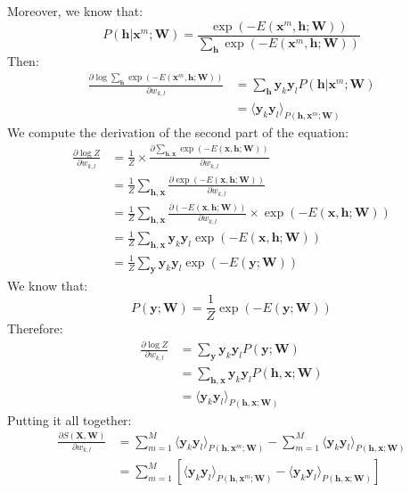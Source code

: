\documentclass[11pt, oneside]{article}   	%
\begin{document}
	Moreover, we know that:
	\[P(\mathbf h | \mathbf x^m;\mathbf W) = \frac{\exp(-E(\mathbf x^m,\mathbf h;\mathbf W))}{\sum_\mathbf h\exp(-E(\mathbf x^m,\mathbf h;\mathbf W))}\]
	Then:
	\[\begin{split}
		\frac{\partial \log\sum_\mathbf h\exp(-E(\mathbf x^m,\mathbf h;\mathbf W))}{\partial w_{k,l}}&=\sum_\mathbf h \mathbf y_{k}\mathbf y_{l} P(\mathbf h | \mathbf x^m;\mathbf W)\\
		&=\langle \mathbf y_{k} \mathbf y_{l}\rangle_{P(\mathbf h,\mathbf x^m;\mathbf W)}
	\end{split}\]
	We compute the derivation of the second part of the equation:
	\[\begin{split}
		\frac{\partial \log Z}{\partial w_{k,l}}&=\frac{1}{Z}\times \frac{\partial \sum_{\mathbf h, \mathbf x}\exp(-E(\mathbf x, \mathbf h; \mathbf W))}{\partial w_{k,l}}\\
		&=\frac{1}{Z}\sum_{\mathbf h, \mathbf x}\frac{\partial \exp(-E(\mathbf x, \mathbf h; \mathbf W))}{\partial w_{k,l}}\\
		&=\frac{1}{Z}\sum_{\mathbf h, \mathbf x}\frac{\partial(-E(\mathbf x, \mathbf h; \mathbf W))}{\partial w_{k,l}}\times \exp(-E(\mathbf x, \mathbf h; \mathbf W))\\
		&=\frac{1}{Z}\sum_{\mathbf h, \mathbf x}\mathbf y_{k}\mathbf y_{l}\exp(-E(\mathbf x, \mathbf h; \mathbf W))\\
		&=\frac{1}{Z}\sum_{\mathbf y}\mathbf y_{k}\mathbf y_{l}\exp(-E(\mathbf y; \mathbf W))
	\end{split}\]
	We know that:
	\[P(\mathbf y;\mathbf W) = \frac{1}{Z}\exp(-E(\mathbf y; \mathbf W))\]
	Therefore:
	\[\begin{split}
		\frac{\partial \log Z}{\partial w_{k,l}}&=\sum_{\mathbf y}\mathbf y_{k}\mathbf y_{l}P(\mathbf y;\mathbf W)\\
		&=\sum_{\mathbf h, \mathbf x}\mathbf y_{k}\mathbf y_{l}P(\mathbf h,\mathbf x;\mathbf W)\\
		&=\langle \mathbf y_{k} \mathbf y_{l}\rangle_{P(\mathbf h,\mathbf x;\mathbf W)}
	\end{split}\]
	Putting it all together:
	\[\begin{split}
		\frac{\partial S(\mathbf X, \mathbf W)}{\partial w_{k,l}}&=\sum_{m=1}^M\langle \mathbf y_{k} \mathbf y_{l}\rangle_{P(\mathbf h,\mathbf x^m;\mathbf W)} - \sum_{m=1}^M\langle \mathbf y_{k} \mathbf y_{l}\rangle_{P(\mathbf h,\mathbf x;\mathbf W)}\\
		&=\sum_{m=1}^M[\langle \mathbf y_{k} \mathbf y_{l}\rangle_{P(\mathbf h,\mathbf x^m;\mathbf W)} - \langle \mathbf y_{k} \mathbf y_{l}\rangle_{P(\mathbf h,\mathbf x;\mathbf W)}]
	\end{split}\]
\end{document}
